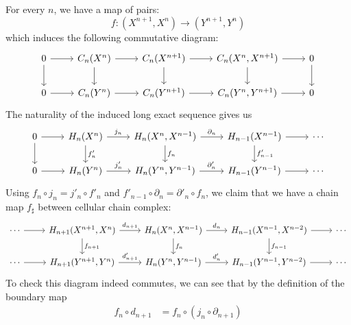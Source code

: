 \documentclass[a4paper, 12pt]{article}
\begin{document}
\begin{solution}
For every \(n\), we have a map of pairs:
\[f:(X^{n+1},X^n)\rightarrow (Y^{n+1},Y^n)\]
which induces the following commutative diagram:
\[\begin{tikzcd}
	0 & {C_n(X^n)} & {C_n(X^{n+1})} & {C_n(X^n,X^{n+1})} & 0 \\
	0 & {C_n(Y^n)} & {C_n(Y^{n+1})} & {C_n(Y^n,Y^{n+1})} & 0
	\arrow[from=1-1, to=1-2]
	\arrow[from=1-1, to=2-1]
	\arrow[from=1-2, to=1-3]
	\arrow[from=1-2, to=2-2]
	\arrow[from=1-3, to=1-4]
	\arrow[from=1-3, to=2-3]
	\arrow[from=1-4, to=1-5]
	\arrow[from=1-4, to=2-4]
	\arrow[from=1-5, to=2-5]
	\arrow[from=2-1, to=2-2]
	\arrow[from=2-2, to=2-3]
	\arrow[from=2-3, to=2-4]
	\arrow[from=2-4, to=2-5]
\end{tikzcd}\]
The naturality of the induced long exact sequence gives us 
\[\begin{tikzcd}
	0 & {H_n(X^n)} & {H_n(X^n,X^{n-1})} & {H_{n-1}(X^{n-1})} & \cdots \\
	0 & {H_n(Y^n)} & {H_n(Y^n,Y^{n-1})} & {H_{n-1}(Y^{n-1})} & \cdots
	\arrow[from=1-1, to=1-2]
	\arrow[from=1-1, to=2-1]
	\arrow["{j_n}", from=1-2, to=1-3]
	\arrow["{f'_n}", from=1-2, to=2-2]
	\arrow["{\partial_n}", from=1-3, to=1-4]
	\arrow["{f_n}", from=1-3, to=2-3]
	\arrow[from=1-4, to=1-5]
	\arrow["{f'_{n-1}}", from=1-4, to=2-4]
	\arrow[from=2-1, to=2-2]
	\arrow["{j'_n}", from=2-2, to=2-3]
	\arrow["{\partial'_n}", from=2-3, to=2-4]
	\arrow[from=2-4, to=2-5]
\end{tikzcd}\]
Using \(f_n\circ j_n=j'_n\circ f'_n\) and \(f'_{n-1}\circ \partial_n=\partial'_n\circ f_n\), we claim that we have a chain map \(f_\sharp\) between cellular chain complex:
\[\begin{tikzcd}
	\cdots & {H_{n+1}(X^{n+1},X^n)} & {H_n(X^n,X^{n-1})} & {H_{n-1}(X^{n-1},X^{n-2})} & \cdots \\
	\cdots & {H_{n+1}(Y^{n+1},Y^n)} & {H_n(Y^n,Y^{n-1})} & {H_{n-1}(Y^{n-1},Y^{n-2})} & \cdots
	\arrow[from=1-1, to=1-2]
	\arrow["{d_{n+1}}", from=1-2, to=1-3]
	\arrow["{f_{n+1}}", from=1-2, to=2-2]
	\arrow["{d_n}", from=1-3, to=1-4]
	\arrow["{f_n}", from=1-3, to=2-3]
	\arrow[from=1-4, to=1-5]
	\arrow["{f_{n-1}}", from=1-4, to=2-4]
	\arrow[from=2-1, to=2-2]
	\arrow["{d'_{n+1}}", from=2-2, to=2-3]
	\arrow["{d'_n}", from=2-3, to=2-4]
	\arrow[from=2-4, to=2-5]
\end{tikzcd}\]
To check this diagram indeed commutes, we can see that by the definition of the boundary map
\begin{align*}
    f_n\circ d_{n+1}&=f_n\circ (j_n\circ \partial_{n+1})\\ 

\end{align*}
\end{solution}
\end{document}
